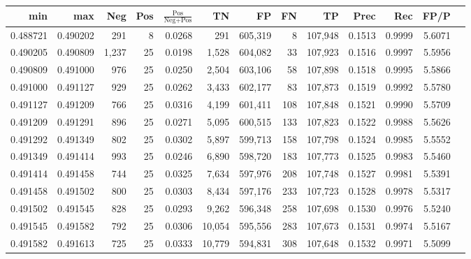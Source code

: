 \begin{tabular}{rrrrrrrrrrrrr}
\toprule
     min &      max &   Neg & Pos & $\frac{\text{Pos}}{\text{Neg}+\text{Pos}}$ &      TN &      FP &      FN &      TP &   Prec &    Rec &   FP/P \\
\midrule
0.488721 & 0.490202 &   291 &   8 &                                     0.0268 &     291 & 605,319 &       8 & 107,948 & 0.1513 & 0.9999 & 5.6071 \\
0.490205 & 0.490809 & 1,237 &  25 &                                     0.0198 &   1,528 & 604,082 &      33 & 107,923 & 0.1516 & 0.9997 & 5.5956 \\
0.490809 & 0.491000 &   976 &  25 &                                     0.0250 &   2,504 & 603,106 &      58 & 107,898 & 0.1518 & 0.9995 & 5.5866 \\
0.491000 & 0.491127 &   929 &  25 &                                     0.0262 &   3,433 & 602,177 &      83 & 107,873 & 0.1519 & 0.9992 & 5.5780 \\
0.491127 & 0.491209 &   766 &  25 &                                     0.0316 &   4,199 & 601,411 &     108 & 107,848 & 0.1521 & 0.9990 & 5.5709 \\
0.491209 & 0.491291 &   896 &  25 &                                     0.0271 &   5,095 & 600,515 &     133 & 107,823 & 0.1522 & 0.9988 & 5.5626 \\
0.491292 & 0.491349 &   802 &  25 &                                     0.0302 &   5,897 & 599,713 &     158 & 107,798 & 0.1524 & 0.9985 & 5.5552 \\
0.491349 & 0.491414 &   993 &  25 &                                     0.0246 &   6,890 & 598,720 &     183 & 107,773 & 0.1525 & 0.9983 & 5.5460 \\
0.491414 & 0.491458 &   744 &  25 &                                     0.0325 &   7,634 & 597,976 &     208 & 107,748 & 0.1527 & 0.9981 & 5.5391 \\
0.491458 & 0.491502 &   800 &  25 &                                     0.0303 &   8,434 & 597,176 &     233 & 107,723 & 0.1528 & 0.9978 & 5.5317 \\
0.491502 & 0.491545 &   828 &  25 &                                     0.0293 &   9,262 & 596,348 &     258 & 107,698 & 0.1530 & 0.9976 & 5.5240 \\
0.491545 & 0.491582 &   792 &  25 &                                     0.0306 &  10,054 & 595,556 &     283 & 107,673 & 0.1531 & 0.9974 & 5.5167 \\
0.491582 & 0.491613 &   725 &  25 &                                     0.0333 &  10,779 & 594,831 &     308 & 107,648 & 0.1532 & 0.9971 & 5.5099 \\

\end{tabular}

